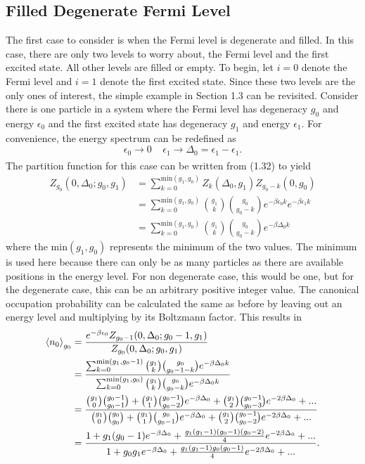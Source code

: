 \subsection{Filled Degenerate Fermi Level}
The first case to consider is when the Fermi level is degenerate and filled. In this case, there are only two levels to worry about, the Fermi level and the first excited state. All other levels are filled or empty. To begin, let $i=0$ denote the Fermi level and $i=1$ denote the first excited state. Since these two levels are the only ones of interest, the simple example in Section 1.3 can be revisited. Consider there is one particle in a system where the Fermi level has degeneracy $g_0$ and energy $\epsilon_0$ and the first excited state has degeneracy $g_1$ and energy $\epsilon_1$. For convenience, the energy spectrum can be redefined as
\begin{equation}
    \epsilon_0 \xrightarrow[]{} 0\ \ \ \ \ \epsilon_1\xrightarrow[]{}\Delta_0=\epsilon_1-\epsilon_1.\nonumber
\end{equation}
The partition function for this case can be written from (1.32) to yield
\begin{align}
    Z_{g_0}(0,\Delta_0;g_0,g_1)&=\sum_{k=0}^{\text{min}(g_1,g_0)} Z_k(\Delta_0,g_1)Z_{g_0-k}(0,g_0)\nonumber\\
    &=\sum_{k=0}^{\text{min}(g_1,g_0)} {g_1 \choose k}{g_0\choose g_0-k} e^{-\beta \epsilon_0 k}e^{-\beta \epsilon_1 k}\nonumber\\
    &=\sum_{k=0}^{\text{min}(g_1,g_0)} {g_1 \choose k}{g_0\choose g_0-k} e^{-\beta \Delta_0 k}
\end{align}
where the $\text{min}(g_1,g_0)$ represents the minimum of the two values. The minimum is used here because there can only be as many particles as there are available positions in the energy level. For non degenerate case, this would be one, but for the degenerate case, this can be an arbitrary positive integer value. The canonical occupation probability can be calculated the same as before by leaving out an energy level and multiplying by its Boltzmann factor. This results in 
\begin{align}
    \left<{n_0}\right>_{g_0}&=\frac{e^{-\beta \epsilon_0}Z_{g_0-1}(0,\Delta_0;g_0-1,g_1)}{Z_{g_0}(0,\Delta_0;g_0,g_1)}\nonumber\\
    &=\frac{\sum_{k=0}^{\text{min}(g_1,g_0-1)} {g_1 \choose k}{g_0\choose g_0-1-k} e^{-\beta \Delta_0 k}}{\sum_{k=0}^{\text{min}(g_1,g_0)} {g_1 \choose k}{g_0\choose g_0-k} e^{-\beta \Delta_0 k }}\nonumber\\
    &=\frac{{g_1\choose 0}{g_0-1\choose g_0-1}+{g_1 \choose 1}{g_0-1\choose g_0-2}e^{-\beta\Delta_0}+{g_1\choose 2}{g_0-1\choose g_0-3}e^{-2\beta\Delta_0}+...}{{g_1\choose 0}{g_0\choose g_0}+{g_1 \choose 1}{g_0\choose g_0-1}e^{-\beta\Delta_0}+{g_1\choose 2}{g_0-1\choose g_0-2}e^{-2\beta\Delta_0}+...}\nonumber\\
    &=\frac{1+g_1(g_0-1)e^{-\beta\Delta_0}+\frac{g_1(g_1-1)(g_0-1)(g_0-2)}{4}e^{-2\beta\Delta_0}+...}{1+g_0g_1e^{-\beta\Delta_0}+\frac{g_1(g_1-1)g_0(g_0-1)}{4}e^{-2\beta\Delta_0}+...}.
\end{align}
